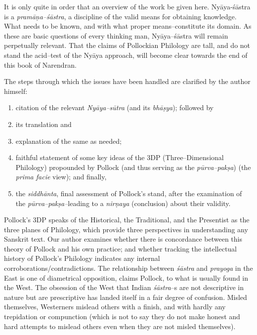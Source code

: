 It is only quite in order that an overview of the work be given here. Nyāya-śāstra is a \textit{pramāṇa–śāstra}, a discipline of the valid means for obtaining knowledge. What needs to be known, and with what proper means–constitute its domain. As these are basic questions of every thinking man, Nyāya–śāstra will remain perpetually relevant. That the claims of Pollockian Philology are tall, and do not stand the acid–test of the Nyāya approach, will become clear towards the end of this book of Narendran.

The steps through which the issues have been handled are clarified by the author himself:

\vspace{-.2cm}

\begin{enumerate}
\itemsep=0pt
\item citation of the relevant \textit{Nyāya–sūtra} (and its \textit{bhāṣya}); followed by

 \item its translation and

 \item explanation of the same as needed;

 \item faithful statement of some key ideas of the 3DP (Three–Dimensional Philology) propounded by Pollock (and thus serving as the \textit{pūrva–pakṣa}) (the \textit{prima facie} view); and finally,

 \item the \textit{siddhānta}, final assessment of Pollock’s stand, after the examination of the \textit{pūrva–pakṣa–}leading to a \textit{nirṇaya} (conclusion) about their validity.

\end{enumerate}

\vspace{-.2cm}

Pollock’s 3DP speaks of the Historical, the Traditional, and the Presentist as the three planes of Philology, which provide three perspectives in understanding any Sanskrit text. Our author examines whether there is concordance between this theory of Pollock and his own practice; and whether tracking the intellectual history of Pollock’s Philology indicates any internal corroborations/contradictions. The relationship between \textit{śāstra} and \textit{prayoga} in the East is one of diametrical opposition, claims Pollock, to what is usually found in the West. The obsession of the West that Indian \textit{śāstra}–s are not descriptive in nature but are prescriptive has landed itself in a fair degree of confusion. Misled themselves, Westerners mislead others with a finish, and with hardly any trepidation or compunction (which is not to say they do not make honest and hard attempts to mislead others even when they are not misled themselves).

